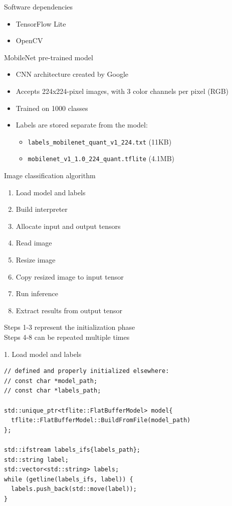 \begin{frame}{Software dependencies}
  \begin{itemize}
	\item TensorFlow Lite
	\item OpenCV
  \end{itemize}
\end{frame}

\begin{frame}{MobileNet pre-trained model}
  \begin{itemize}
	\item CNN architecture created by Google
	\item Accepts 224x224-pixel images, with 3 color channels per pixel (RGB)
	\item Trained on 1000 classes
	\item Labels are stored separate from the model:
	  \begin{itemize}
		\item \texttt{labels\_mobilenet\_quant\_v1\_224.txt} (11KB)
		\item \texttt{mobilenet\_v1\_1.0\_224\_quant.tflite} (4.1MB)
	  \end{itemize}
  \end{itemize}
\end{frame}

\begin{frame}{Image classification algorithm}
  \begin{enumerate}
	\item Load model and labels
	\item Build interpreter
	\item Allocate input and output tensors
	\item Read image
	\item Resize image
	\item Copy resized image to input tensor
	\item Run inference
	\item Extract results from output tensor
  \end{enumerate}
\bigskip
Steps 1-3 represent the initialization phase \\
Steps 4-8 can be repeated multiple times
\end{frame}

\begin{frame}[fragile]{1. Load model and labels}
  \lstset{basicstyle=\ttfamily\small, numbers=left, columns=fullflexible}
  \begin{lstlisting}
// defined and properly initialized elsewhere:
// const char *model_path;
// const char *labels_path;

std::unique_ptr<tflite::FlatBufferModel> model{
  tflite::FlatBufferModel::BuildFromFile(model_path)
};

std::ifstream labels_ifs{labels_path};
std::string label;
std::vector<std::string> labels;
while (getline(labels_ifs, label)) {
  labels.push_back(std::move(label));
}
  \end{lstlisting}
\end{frame}

